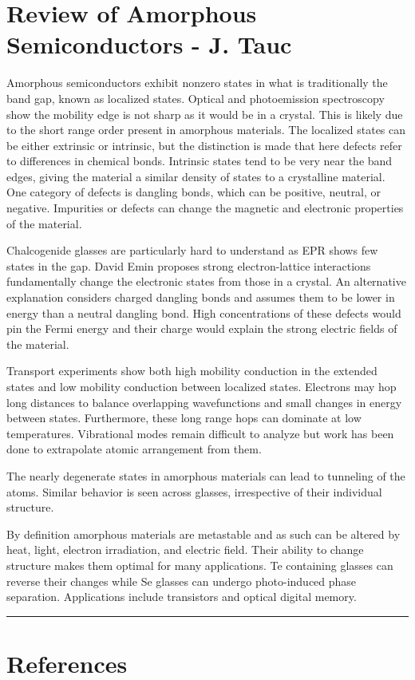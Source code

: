 \documentclass[12pt]{elsarticle}
\newcommand{\fullline}{\noindent\rule{14cm}{0.4pt} \vspace{4mm}}
\begin{document}
\section*{Review of Amorphous Semiconductors - J. Tauc \cite{Tauc1976}} 
Amorphous semiconductors exhibit nonzero states in what is traditionally the band gap, known as localized states. Optical and photoemission spectroscopy show the mobility edge is not sharp as it would be in a crystal. This is likely due to the short range order present in amorphous materials. The localized states can be either extrinsic or intrinsic, but the distinction is made that here defects refer to differences in chemical bonds. Intrinsic states tend to be very near the band edges, giving the material a similar density of states to a crystalline material. One category of defects is dangling bonds, which can be positive, neutral, or negative. Impurities or defects can change the magnetic and electronic properties of the material.
\par 
Chalcogenide glasses are particularly hard to understand as EPR shows few states in the gap. David Emin proposes strong electron-lattice interactions fundamentally change the electronic states from those in a crystal. An alternative explanation considers charged dangling bonds and assumes them to be lower in energy than a neutral dangling bond. High concentrations of these defects would pin the Fermi energy and their charge would explain the strong electric fields of the material.
\par
Transport experiments show both high mobility conduction in the extended states and low mobility conduction between localized states. Electrons may hop long distances to balance overlapping wavefunctions and small changes in energy between states. Furthermore, these long range hops can dominate at low temperatures. Vibrational modes remain difficult to analyze but work has been done to extrapolate atomic arrangement from them.
\par 
The nearly degenerate states in amorphous materials can lead to tunneling of the atoms. Similar behavior is seen across glasses, irrespective of their individual structure.
\par 
By definition amorphous materials are metastable and as such can be altered by heat, light, electron irradiation, and electric field. Their ability to change structure makes them optimal for many applications. Te containing glasses can reverse their changes while Se glasses can undergo photo-induced phase separation. Applications include transistors and optical digital memory.
\fullline
\section*{References}


\end{document}
